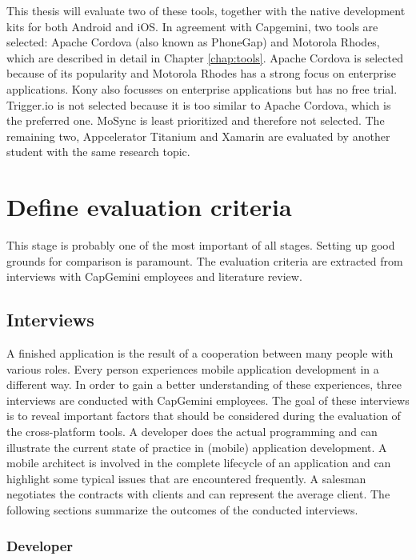 This thesis will evaluate two of these tools, together with the native development kits for both Android and iOS. In agreement with Capgemini, two tools are selected: Apache Cordova (also known as PhoneGap) and Motorola Rhodes, which are described in detail in Chapter \ref{chap:tools}. Apache Cordova is selected because of its popularity and Motorola Rhodes has a strong focus on enterprise applications. Kony also focusses on enterprise applications but has no free trial. Trigger.io is not selected because it is too similar to Apache Cordova, which is the preferred one. MoSync is least prioritized and therefore not selected. The remaining two, Appcelerator Titanium and Xamarin are evaluated by another student with the same research topic. 

\section{Define evaluation criteria}

This stage is probably one of the most important of all stages. Setting up good grounds for comparison is paramount. The evaluation criteria are extracted from interviews with CapGemini employees and literature review.

\subsection{Interviews}
\label{sec:interviews}

A finished application is the result of a cooperation between many people with various roles. Every person experiences mobile application development in a different way. In order to gain a better understanding of these experiences, three interviews are conducted with CapGemini employees. The goal of these interviews is to reveal important factors that should be considered during the evaluation of the cross-platform tools. A developer does the actual programming and can illustrate the current state of practice in (mobile) application development. A mobile architect is involved in the complete lifecycle of an application and can highlight some typical issues that are encountered frequently. A salesman negotiates the contracts with clients and can represent the average client. The following sections summarize the outcomes of the conducted interviews.

\subsubsection{Developer}

